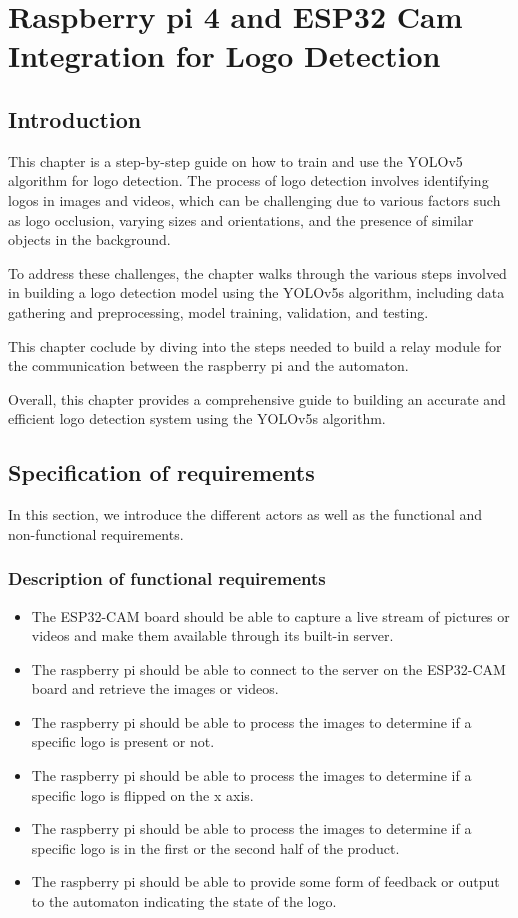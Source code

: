 %



%



\chapter{Raspberry pi 4 and ESP32 Cam Integration for Logo Detection}
\section{Introduction}
This chapter is a step-by-step guide on how to train and use the YOLOv5 algorithm for logo detection. The process of logo detection involves identifying logos in images and videos, which can be challenging due to various factors such as logo occlusion, varying sizes and orientations, and the presence of similar objects in the background.

To address these challenges, the chapter walks through the various steps involved in building a logo detection model using the YOLOv5s algorithm, including data gathering and preprocessing, model training, validation, and testing. 



This chapter coclude by diving into the steps needed to build a relay  module for the communication between the raspberry pi and the automaton.

 Overall, this chapter provides a comprehensive guide to building an accurate and efficient logo detection system using the YOLOv5s algorithm.
\section{Specification of requirements}
In this section, we introduce the different actors as well as the functional and non-functional requirements.
\subsection{Description of functional requirements}
\begin{itemize}
\item The ESP32-CAM board should be able to capture a live stream of pictures or videos and make them available through its built-in server.
\item The raspberry pi should be able to connect to the server on the ESP32-CAM board and retrieve the images or videos.
\item The raspberry pi should be able to process the images to determine if a specific logo is present or not.
\item The raspberry pi should be able to process the images to determine if a specific logo is flipped on the x axis.
\item The raspberry pi should be able to process the images to determine if a specific logo is in the first or the second half of the product.
\item The raspberry pi should be able to provide some form of feedback or output to the automaton indicating the state of the logo.
\end{itemize}
